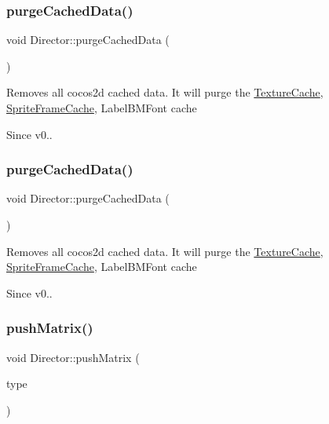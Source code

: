 \subsubsection{\texorpdfstring{purge\+Cached\+Data()}{purgeCachedData()}\hspace{0.1cm}{\footnotesize\ttfamily [1/2]}}
{\footnotesize\ttfamily void Director\+::purge\+Cached\+Data (\begin{DoxyParamCaption}\item[{void}]{ }\end{DoxyParamCaption})}

Removes all cocos2d cached data. It will purge the \hyperlink{classTextureCache}{Texture\+Cache}, \hyperlink{classSpriteFrameCache}{Sprite\+Frame\+Cache}, Label\+B\+M\+Font cache \begin{DoxySince}{Since}
v0.. 
\end{DoxySince}
\mbox{\label{classDirector_aed3733d86c85ee8d1f4966801ba5ad19}} 
\subsubsection{\texorpdfstring{purge\+Cached\+Data()}{purgeCachedData()}\hspace{0.1cm}{\footnotesize\ttfamily [2/2]}}
{\footnotesize\ttfamily void Director\+::purge\+Cached\+Data (\begin{DoxyParamCaption}{ }\end{DoxyParamCaption})}

Removes all cocos2d cached data. It will purge the \hyperlink{classTextureCache}{Texture\+Cache}, \hyperlink{classSpriteFrameCache}{Sprite\+Frame\+Cache}, Label\+B\+M\+Font cache \begin{DoxySince}{Since}
v0.. 
\end{DoxySince}
\mbox{\label{classDirector_afbc7bc9b5641105eae937965146ea3e2}} 
\subsubsection{\texorpdfstring{push\+Matrix()}{pushMatrix()}\hspace{0.1cm}{\footnotesize\ttfamily [1/2]}}
{\footnotesize\ttfamily void Director\+::push\+Matrix (\begin{DoxyParamCaption}\item[{\hyperlink{group__base_ga4d146cef7130a8f3a953d46964ea3905}{M\+A\+T\+R\+I\+X\+\_\+\+S\+T\+A\+C\+K\+\_\+\+T\+Y\+PE}}]{type }\end{DoxyParamCaption})}

